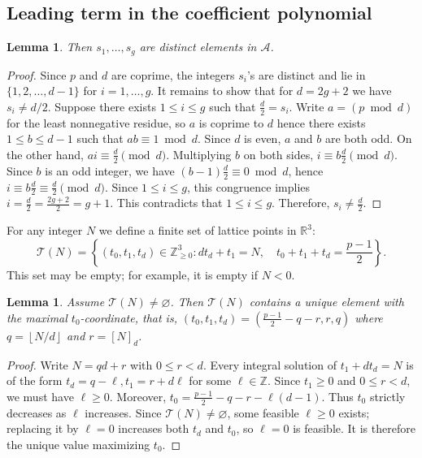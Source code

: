 \documentclass{amsart}
\theoremstyle{plain}
\newtheorem{lemma}[theorem]{Lemma}
\theoremstyle{remark}
\theoremstyle{remark}
\newcommand{\cA}{\mathcal{A}}
\newcommand{\cT}{\mathcal{T}}
\newcommand{\pfloor}[1]{\left\lfloor #1 \right\rfloor}
\newcommand{\0}{\mathbf{0}}
\newcommand{\1}{\mathbf{1}}
\newcommand{\R}{\mathbb{R}}
\begin{document}
\subsection{Leading term in the coefficient polynomial}

\begin{lemma}\label{L:S_d}
Then $s_1,\ldots,s_g$ are distinct elements in $\cA$.
\end{lemma}

\begin{proof}
Since $p$ and $d$ are coprime, the integers $s_i$'s are distinct and lie in $\{1,2,\ldots,d-1\}$ for $i=1,\dots,g$.
It remains to show that for $d=2g+2$ we have $s_i\ne d/2$.
Suppose there exists $1\le i\le g$ such that $\frac{d}{2}=s_i$.
Write $a=(p\bmod d)$ for the least nonnegative residue, so $a$ is coprime to $d$ hence there exists $1\le b\le d-1$ such that $ab\equiv 1\bmod d$.
Since $d$ is even, $a$ and $b$ are both odd. 
On the other hand, $ai \equiv\frac{d}{2}\pmod d$. Multiplying $b$ on both sides,
$
i\equiv b\frac{d}{2}\pmod d.
$
Since $b$ is an odd integer, we have $(b-1)\frac{d}{2}\equiv 0\bmod d$, hence 
$
i\equiv b\frac{d}{2}\equiv \frac{d}{2}\pmod d.
$
Since $1\le i\le g$, this congruence implies $i=\frac{d}{2}=\frac{2g+2}{2}=g+1$.
This contradicts that $1\le i\le g$. Therefore, $s_i\neq \frac{d}{2}$.
\end{proof}

For any integer $N$ we define a finite set of lattice points in $\R^3$:
\[
\cT(N)=\left\{(t_0,t_1,t_d)\in\mathbb Z_{\ge 0}^3:
        d t_d+t_1=N,\quad t_0+t_1+t_d=\frac{p-1}{2}\right\}.
\]
This set may be empty; for example, it is empty if $N< 0$.



\begin{lemma}\label{L:unique}
Assume $\cT(N)\neq \varnothing$. Then 
$\cT(N)$ contains a unique  element
with the maximal $t_0$-coordinate, that is,
$(t_0,t_1,t_d)=(\frac{p-1}{2}-q-r,r,q)$
where $q=\pfloor{N/d}$ and $r=[N]_d$.
\end{lemma}
\begin{proof}

Write \(N=qd+r\) with \(0\le r<d\). Every integral solution of
\(t_1+dt_d=N\) is of the form
$
t_d=q-\ell, t_1=r+d\ell
$
for some \(\ell\in\mathbb Z\). Since \(t_1\ge0\) and \(0\le r<d\),
we must have \(\ell\ge0\). Moreover,
$
t_0=\frac{p-1}{2}-q-r-\ell(d-1).
$
Thus \(t_0\) strictly decreases as \(\ell\) increases. Since
\(\cT(N)\neq\varnothing\), some feasible \(\ell\ge0\) exists; replacing
it by \(\ell=0\) increases both \(t_d\) and \(t_0\), so \(\ell=0\)
is feasible. It is therefore the unique value maximizing \(t_0\).
\end{proof}
\end{document}
